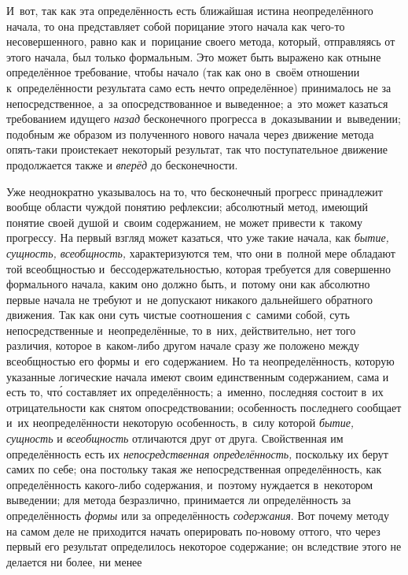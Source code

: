 И~вот, так как эта определённость есть ближайшая истина
неопределённого начала, то она представляет собой порицание этого начала
как чего-то несовершенного, равно как и~порицание своего метода, который,
отправляясь от этого начала, был только формальным. Это может быть выражено
как отныне определённое требование, чтобы начало (так как оно в~своём
отношении к~определённости результата само есть нечто определённое)
принималось не за непосредственное, а~за опосредствованное и
выведенное; а~это может казаться требованием идущего
{\em назад} бесконечного
прогресса в~доказывании и~выведении; подобным же образом из полученного
нового начала через движение метода опять-таки проистекает некоторый
результат, так что поступательное движение продолжается также и
{\em вперёд} до бесконечности.

Уже неоднократно указывалось на то, что бесконечный прогресс
принадлежит вообще области чуждой понятию рефлексии; абсолютный метод,
имеющий понятие своей душой и~своим содержанием, не может привести к~такому
прогрессу. На первый взгляд может казаться, что уже такие начала, как
{\em бытие, сущность, всеобщность,}
характеризуются тем, что они в~полной мере обладают той
всеобщностью и~бессодержательностью, которая требуется для совершенно
формального начала, каким оно должно быть, и~потому они как абсолютно
первые начала не требуют и~не допускают никакого дальнейшего обратного
движения. Так как они суть чистые соотношения с~самими собой, суть
непосредственные и~неопределённые, то в~них, действительно, нет того
различия, которое в~каком-либо другом начале сразу же положено между
всеобщностью его формы и~его содержанием. Но та неопределённость, которую
указанные логические начала имеют своим единственным содержанием, сама и
есть то, чт\'{о} составляет их определённость; а~именно, последняя состоит в~их
отрицательности как снятом опосредствовании; особенность последнего
сообщает и~их неопределённости некоторую особенность, в~силу которой
{\em бытие, сущность} и {\em всеобщность}
отличаются друг от друга. Свойственная им определённость есть
их {\em непосредственная
определённость,} поскольку их берут самих по себе; она
постольку такая же непосредственная определённость, как определённость
какого-либо содержания, и~поэтому нуждается в~некотором выведении; для
метода безразлично, принимается ли определённость за определённость
{\em формы} или за определённость {\em содержания}.
Вот почему методу на самом деле не приходится начать
оперировать по-новому оттого, что через первый его результат определилось
некоторое содержание; он вследствие этого не делается ни более, ни менее
